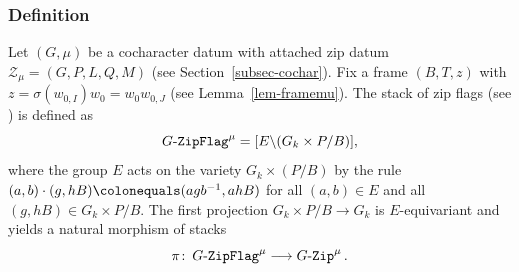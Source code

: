 \documentclass[11pt]{amsart}
\numberwithin{equation}{section}
\theoremstyle{definition}
\theoremstyle{remark}
\newcommand{\GZip}{\mathop{\text{$G$-{\tt Zip}}}\nolimits}
\newcommand{\GF}{\mathop{\text{$G$-{\tt ZipFlag}}}\nolimits}
\newcommand{\Zcal}{{\mathcal Z}}
\newcommand{\lra}{\longrightarrow}
\begin{document}
\subsubsection{Definition}
Let $(G,\mu)$ be a cocharacter datum with attached zip datum $\Zcal_{\mu}=(G,P,L,Q,M)$ (see Section~\ref{subsec-cochar}). Fix a frame $(B,T,z)$ with $z=\sigma(w_{0,I})w_0=w_0w_{0,J}$ (see Lemma~\ref{lem-framemu}). The stack of zip flags (see \cite[Definition 2.1.1]{Goldring-Koskivirta-Strata-Hasse}) is defined as
\begin{equation}\label{eq-Gzipflag-PmodB}
\GF^\mu=[E\backslash (G_k \times P/B)],     
\end{equation}
where the group $E$ acts on the variety $G_k \times (P/B)$ by the rule $(a,b)\cdot (g,hB) \colonequals (agb^{-1},ahB)$ for all $(a,b)\in E$ and all $(g,hB)\in G_k \times P/B$. The first projection $G_k \times P/B \to G_k$ is $E$-equivariant and yields a natural morphism of stacks
 \begin{equation}\label{projmap-flag}
     \pi  \colon  \GF^\mu \lra \GZip^\mu.
 \end{equation}
\end{document}
